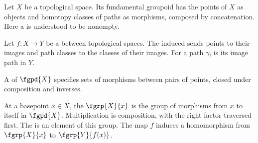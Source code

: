 Let $X$ be a topological space.  Its fundamental groupoid
 has the points of $X$ as objects
and homotopy classes of paths as morphisms, composed by concatenation.
Here a  is understood to
be nonempty.

Let $f:X\longrightarrow Y$ be a  between topological spaces.
The induced 
 sends points to their images
and path classes to the classes of their images.  For a path $\gamma$,
 is its image path in $Y$.

A  of $\fgpd{X}$ specifies
sets of morphisms between pairs of points, closed under composition and
inverses.

At a basepoint $x\in X$, the 
$\fgrp{X}{x}$ is the group of morphisms from $x$ to itself in $\fgpd{X}$.
Multiplication is composition, with the right factor traversed first.
The  is an element
of this group.  The map $f$ induces a homomorphism
 from $\fgrp{X}{x}$ to
$\fgrp{Y}{f(x)}$.
